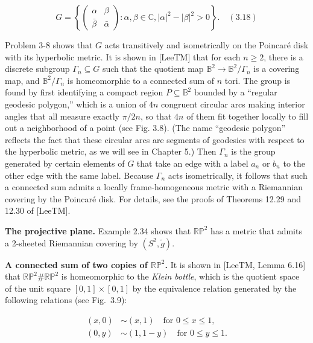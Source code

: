 \[
G = \left\{ \begin{pmatrix} \alpha & \beta \\ \bar{\beta} & \bar{\alpha} \end{pmatrix} : \alpha, \beta \in \mathbb{C}, |\alpha|^2 - |\beta|^2 > 0 \right\}. \quad (3.18)
\]

Problem 3-8 shows that $G$ acts transitively and isometrically on the Poincaré disk with its hyperbolic metric. It is shown in [LeeTM] that for each $n \geq 2$, there is a discrete subgroup $\Gamma_n \subseteq G$ such that the quotient map $\mathbb{B}^2 \to \mathbb{B}^2/\Gamma_n$ is a covering map, and $\mathbb{B}^2/\Gamma_n$ is homeomorphic to a connected sum of $n$ tori. The group is found by first identifying a compact region $P \subseteq \mathbb{B}^2$ bounded by a ``regular geodesic polygon,'' which is a union of $4n$ congruent circular arcs making interior angles that all measure exactly $\pi/2n$, so that $4n$ of them fit together locally to fill out a neighborhood of a point (see Fig. 3.8). (The name ``geodesic polygon'' reflects the fact that these circular arcs are segments of geodesics with respect to the hyperbolic metric, as we will see in Chapter 5.) Then $\Gamma_n$ is the group generated by certain elements of $G$ that take an edge with a label $a_n$ or $b_n$ to the other edge with the same label. Because $\Gamma_n$ acts isometrically, it follows that such a connected sum admits a locally frame-homogeneous metric with a Riemannian covering by
the Poincaré disk. For details, see the proofs of Theorems 12.29 and 12.30 of [LeeTM].

\noindent\textbf{The projective plane.} Example 2.34 shows that $\mathbb{RP}^2$ has a metric that admits a 2-sheeted Riemannian covering by $(S^2, \tilde{g})$.

\noindent\textbf{A connected sum of two copies of $\mathbb{RP}^2$.} It is shown in [LeeTM, Lemma 6.16] that $\mathbb{RP}^2 \# \mathbb{RP}^2$ is homeomorphic to the \emph{Klein bottle}, which is the quotient space of the unit square $[0,1] \times [0,1]$ by the equivalence relation generated by the following relations (see Fig.~3.9):


\begin{equation}
\begin{aligned}
(x,0) &\sim (x,1) \quad \text{for } 0 \le x \le 1, \\
(0,y) &\sim (1,1-y) \quad \text{for } 0 \le y \le 1.
\end{aligned}
\tag{3.19}
\end{equation}

